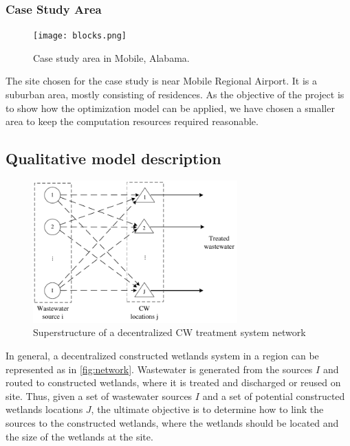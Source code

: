 \documentclass[preprint,12pt,authoryear]{elsarticle}
\begin{document}
\subsubsection{Case Study Area}
\begin{figure}[!htb]
	\centering
	\texttt{[image: blocks.png]}
	\caption{Case study area in Mobile, Alabama.}
	\label{fig:blocks}
\end{figure}

The site chosen for the case study is near Mobile Regional Airport. It is a suburban area, mostly consisting of residences. As the objective of the project is to show how the optimization model can be applied, we have chosen a smaller area to keep the computation resources required reasonable. 

\subsection{Qualitative model description}\label{section:problemstatement}

\begin{figure}[!htpb]
	\centering
	\includegraphics[width=0.7\textwidth]{CWnetwork.pdf}
	\caption{Superstructure of a decentralized CW treatment system network}
	\label{fig:network}
\end{figure}

In general, a decentralized constructed wetlands system in a region can be represented as in \autoref{fig:network}. Wastewater is generated from the sources $I$ and routed to constructed wetlands, where it is treated and discharged or reused on site. Thus, given a set of wastewater sources $I$ and a set of potential constructed wetlands locations $J$, the ultimate objective is to determine how to link the sources to the constructed wetlands, where the wetlands should be located and the size of the wetlands at the site. 
\end{document}
